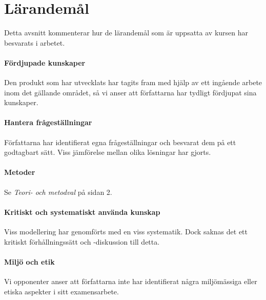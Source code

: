 \section{Lärandemål} %
\label{sec:l_randem_l}
    Detta avsnitt kommenterar hur de lärandemål som är uppsatta av kursen har besvarats i arbetet.

    \paragraph{Fördjupade kunskaper}
        Den produkt som har utvecklats har tagits fram med hjälp av ett ingående arbete inom det gällande området, så vi anser att författarna har tydligt fördjupat sina kunskaper.

    \paragraph{Hantera frågeställningar}
        Författarna har identifierat egna frågeställningar och besvarat dem på ett godtagbart sätt. Viss jämförelse mellan olika lösningar har gjorts.

    \paragraph{Metoder}
        Se \emph{Teori- och metodval} på sidan 2.

    \paragraph{Kritiskt och systematiskt använda kunskap}
        Viss modellering har genomförts med en viss systematik. Dock saknas det ett kritiskt förhållningssätt och -diskussion till detta.

    \paragraph{Miljö och etik}
        Vi opponenter anser att författarna inte har identifierat några  miljömässiga eller etiska aspekter i sitt examensarbete.

